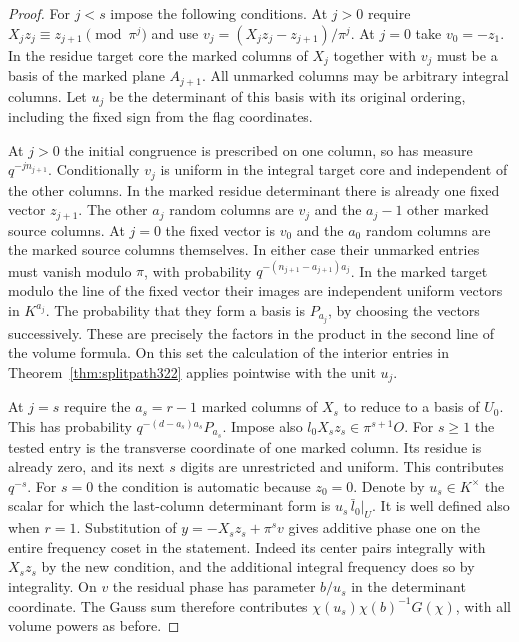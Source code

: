 \documentclass[a4paper,11pt]{article}
\theoremstyle{definition}
\theoremstyle{remark}
\numberwithin{equation}{section}
\begin{document}
\begin{proof}
For \(j<s\) impose the following conditions. At \(j>0\)
require \(X_j z_j\equiv z_{j+1}\pmod{\pi^j}\) and use
\(v_j=(X_jz_j-z_{j+1})/\pi^j\). At \(j=0\) take
\(v_0=-z_1\). In the residue target core the marked
columns of \(X_j\) together with \(v_j\) must be a basis of
the marked plane \(A_{j+1}\). All unmarked columns may
be arbitrary integral columns. Let \(u_j\) be the
determinant of this basis with its original ordering,
including the fixed sign from the flag coordinates.

At \(j>0\) the initial congruence is prescribed on one
column, so has measure \(q^{-j n_{j+1}}\).
Conditionally \(v_j\) is uniform in the integral target
core and independent of the other columns. In the marked
residue determinant there is already one fixed vector
\(z_{j+1}\). The other \(a_j\) random columns are \(v_j\)
and the \(a_j-1\) other marked source columns. At \(j=0\)
the fixed vector is \(v_0\) and the \(a_0\) random columns
are the marked source columns themselves. In either case
their unmarked entries must vanish modulo \(\pi\), with
probability \(q^{-(n_{j+1}-a_{j+1})a_j}\). In the marked
target modulo the line of the fixed vector their images
are independent uniform vectors in \(K^{a_j}\).
The probability that they form a basis is \(P_{a_j}\),
by choosing the vectors successively. These are precisely
the factors in the product in the second line of the
volume formula. On this set the calculation of the
interior entries in Theorem~\ref{thm:splitpath322}
applies pointwise with the unit \(u_j\).

At \(j=s\) require the \(a_s=r-1\) marked columns of
\(X_s\) to reduce to a basis of \(U_0\). This has
probability \(q^{-(d-a_s)a_s}P_{a_s}\). Impose also
\(l_0X_sz_s\in\pi^{s+1}O\). For \(s\ge1\) the tested
entry is the transverse coordinate of one marked column.
Its residue is already zero, and its next \(s\) digits are
unrestricted and uniform. This contributes \(q^{-s}\).
For \(s=0\) the condition is automatic because \(z_0=0\).
Denote by \(u_s\in K^\times\) the scalar for which the
last-column determinant form is \(u_s\,\bar l_0|_U\).
It is well defined also when \(r=1\). Substitution of
\(y=-X_sz_s+\pi^s v\) gives additive phase one on the
entire frequency coset in the statement. Indeed its center
pairs integrally with \(X_sz_s\) by the new condition, and
the additional integral frequency does so by integrality.
On \(v\) the residual phase has parameter \(b/u_s\) in
the determinant coordinate. The Gauss sum therefore
contributes \(\chi(u_s)\chi(b)^{-1}G(\chi)\), with all
volume powers as before.


\end{proof}
\end{document}
